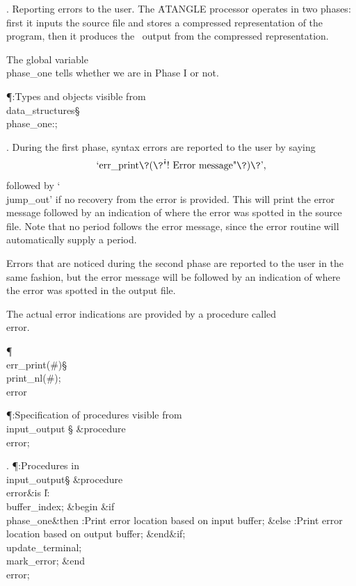 .  Reporting errors to the user.
The \.{ATANGLE} processor operates in two phases: first it inputs the source
file and stores a compressed representation of the program, then it produces
the \ADA\ output from the compressed representation.

The global variable \\{phase\_one} tells whether we are in Phase I or not.

\Y\P\?\4:Types and objects visible from \\{data\_structures}\X\mathrel{+}\S%
\?\6
\\{phase\_one}\?:\?;%
\par
\fi

. During the first phase, syntax errors are reported to the user by saying
$$\hbox{`\\{err\_print}\?(\?\.{"!\ Error\ message"}\?)\?'},$$
followed by `\\{jump\_out}' if no recovery from the error is provided.
This will print the error message followed by an indication of where the
error was spotted in the source file. Note that no period follows the error
message, since the error routine will automatically supply a period.

Errors that are noticed during the second phase are reported to the user
in the same fashion, but the error message will be
followed by an indication of where the error was spotted in the output file.

The actual error indications are provided by a procedure called \\{error}.

\Y\P\4\D\\{err\_print}\?\1(\?\#\?\2)\S\?\\{print\_nl}\?\1(\?\#\?\2)\?;\5
\\{error}\par
\Y\P\?\4:Specification of procedures visible from \\{input\_output}\X%
\mathrel{+}\S\?\6
\&{procedure}\8\1\\{error}\2;\par
\fi

. \P\?:Procedures in \\{input\_output}\X\mathrel{+}\S\?\6
\&{procedure}\8\1\\{error}\2\8\&{is}\8\1\6
\|l\?:\?\\{buffer\_index};\6
\4\&{begin}\6
\&{if}\1\1\8\\{phase\_one}\2\8\&{then}\6
:Print error location based on input buffer\X;\6
\4\&{else}\6
:Print error location based on output buffer\X;\2\6
\&{end}\8\2\&{if}\1;\6
\\{update\_terminal};\5
\\{mark\_error};\2\6
\&{end}\8\\{error};\par
\fi

